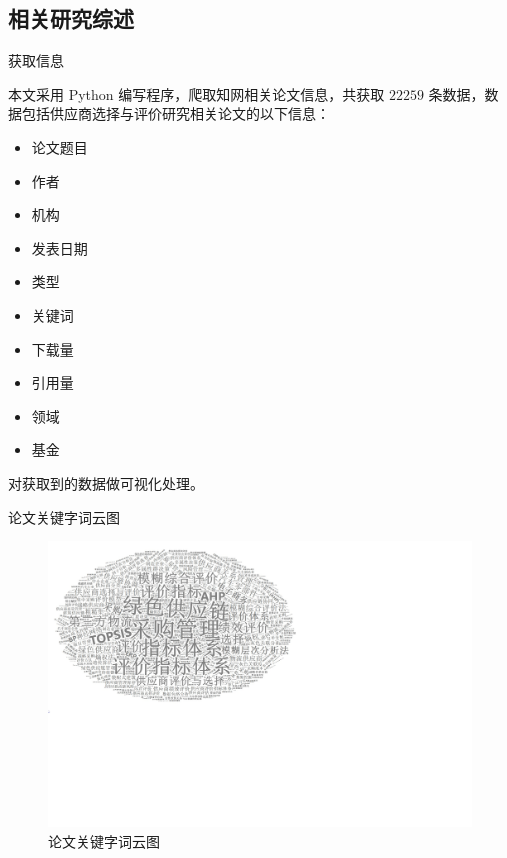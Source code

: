 \documentclass{beamer}
\begin{document}
\subsection{相关研究综述}
\begin{frame}{获取信息}

本文采用 Python 编写程序，爬取知网相关论文信息，共获取 $22259$ 条数据，数据包括供应商选择与评价研究相关论文的以下信息\cite{3}：

\vspace{0.5cm}

\begin{minipage}{0.4\linewidth}
\begin{itemize}
	\item 论文题目
	\item 作者
	\item 机构
	\item 发表日期
	\item 类型
\end{itemize}
\end{minipage}\hspace{1cm}
\begin{minipage}{0.3\linewidth}
\begin{itemize}
	\item 关键词
	\item 下载量
	\item 引用量
	\item 领域
	\item 基金
\end{itemize}
\end{minipage}

\vspace{0.5cm}

对获取到的数据做可视化处理。\cite{2}

\end{frame}

\begin{frame}{论文关键字词云图}
		\begin{figure}[h]
		\centering
		\includegraphics[height=0.76\textheight,trim=20 440 600 20,clip]{pic/wordcloud.pdf}
		\caption{论文关键字词云图}
	\end{figure}
\end{frame}
\end{document}
